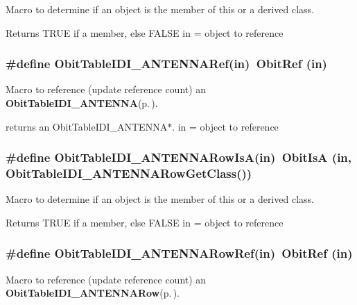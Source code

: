 Macro to determine if an object is the member of this or a derived class. 

Returns TRUE if a member, else FALSE in = object to reference 
\subsubsection{\setlength{\rightskip}{0pt plus 5cm}\#define Obit\-Table\-IDI\_\-ANTENNARef(in)\ Obit\-Ref (in)}\label{ObitTableIDI__ANTENNA_8h_a2}


Macro to reference (update reference count) an {\bf Obit\-Table\-IDI\_\-ANTENNA}{\rm (p.\,\pageref{structObitTableIDI__ANTENNA})}. 

returns an Obit\-Table\-IDI\_\-ANTENNA$\ast$. in = object to reference 
\subsubsection{\setlength{\rightskip}{0pt plus 5cm}\#define Obit\-Table\-IDI\_\-ANTENNARow\-Is\-A(in)\ Obit\-Is\-A (in, Obit\-Table\-IDI\_\-ANTENNARow\-Get\-Class())}\label{ObitTableIDI__ANTENNA_8h_a6}


Macro to determine if an object is the member of this or a derived class. 

Returns TRUE if a member, else FALSE in = object to reference 
\subsubsection{\setlength{\rightskip}{0pt plus 5cm}\#define Obit\-Table\-IDI\_\-ANTENNARow\-Ref(in)\ Obit\-Ref (in)}\label{ObitTableIDI__ANTENNA_8h_a5}


Macro to reference (update reference count) an {\bf Obit\-Table\-IDI\_\-ANTENNARow}{\rm (p.\,\pageref{structObitTableIDI__ANTENNARow})}. 

